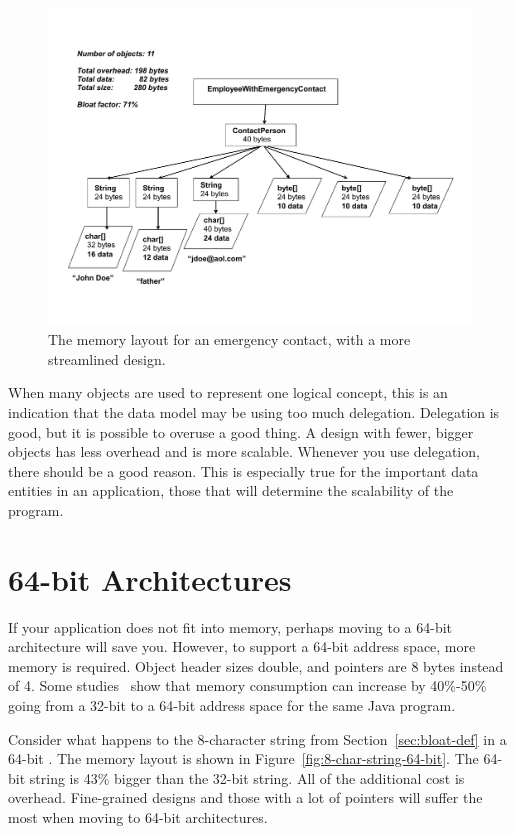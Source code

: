  \begin{figure}[htbp]
  \centering
 \includegraphics[width=\textwidth]{part1/Figures/modelingdatatypes/refactored-fine-grain.pdf}
  \caption{The memory layout for an emergency contact, with a more streamlined
  design.}
  \label{fig:refactored-fine-grain}
\end{figure}

When many objects are used to represent one logical concept, this is an indication that the
data model may be using too much delegation. Delegation is good, but it is possible to overuse a good thing.
A design with fewer, bigger objects has less overhead and is more scalable. Whenever you use delegation, there should
be a good reason. This is especially true for the important data entities in an application, those that will determine
the scalability of the program.  
 
 
\section{64-bit Architectures}

If your application does not fit into memory, perhaps moving to a 64-bit architecture will save you. 
However, to support a 64-bit address space, more memory is required. Object header sizes double, and pointers are
8 bytes instead of 4. Some studies~\cite{compressedAddress} show that memory consumption can increase by 40\%-50\%
going from a 32-bit to a 64-bit address space for the same Java program.

Consider what happens to the 8-character string from
Section~\ref{sec:bloat-def} in a 64-bit \jre. The memory layout is shown in
Figure~\ref{fig:8-char-string-64-bit}. The 64-bit string is 43\% bigger than the
32-bit string. All of the additional cost is overhead. Fine-grained designs
and those with a lot of pointers will suffer the most when moving to 64-bit
architectures.
 
